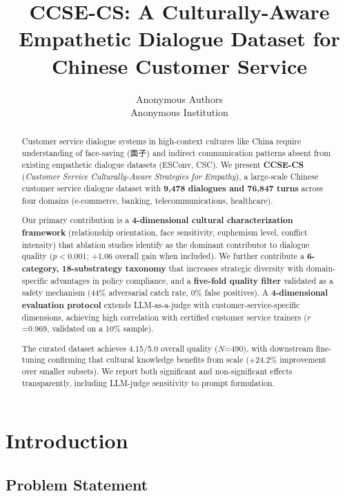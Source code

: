 \documentclass[11pt]{article}
\title{CCSE-CS: A Culturally-Aware Empathetic Dialogue Dataset for Chinese Customer Service}
\author{
  Anonymous Authors \\
  Anonymous Institution
}
\begin{document}
\maketitle

\begin{abstract}
Customer service dialogue systems in high-context cultures like China require understanding of face-saving (面子) and indirect communication patterns absent from existing empathetic dialogue datasets (ESConv, CSC). We present \textbf{CCSE-CS} (\textit{Customer Service Culturally-Aware Strategies for Empathy}), a large-scale Chinese customer service dialogue dataset with \textbf{9,478 dialogues and 76,847 turns} across four domains (e-commerce, banking, telecommunications, healthcare).

Our primary contribution is a \textbf{4-dimensional cultural characterization framework} (relationship orientation, face sensitivity, euphemism level, conflict intensity) that ablation studies identify as the dominant contributor to dialogue quality ($p<$0.001; +1.06 overall gain when included). We further contribute a \textbf{6-category, 18-substrategy taxonomy} that increases strategic diversity with domain-specific advantages in policy compliance, and a \textbf{five-fold quality filter} validated as a safety mechanism (44\% adversarial catch rate, 0\% false positives). A \textbf{4-dimensional evaluation protocol} extends LLM-as-a-judge with customer-service-specific dimensions, achieving high correlation with certified customer service trainers ($r$=0.969, validated on a 10\% sample).

The curated dataset achieves 4.15/5.0 overall quality ($N$=490), with downstream fine-tuning confirming that cultural knowledge benefits from scale (+24.2\% improvement over smaller subsets). We report both significant and non-significant effects transparently, including LLM-judge sensitivity to prompt formulation.
\end{abstract}




\section{Introduction}

\subsection*{Problem Statement}
\end{document}
